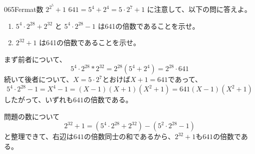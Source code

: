 \begin{prob}{065}{}{Fermat数 $2^{2^5}+1$}
 $641=5^4+2^4=5\cdot 2^7 +1$ に注意して、以下の問に答えよ。
 \begin{enumerate}
  \item $5^4\cdot 2^{28}+2^{32}$ と $5^4\cdot 2^{28} -1$ は641の倍数であることを示せ。
  \item $2^{32}+1$ は641の倍数であることを示せ。
 \end{enumerate}
\end{prob}
まず前者について、
\[ 5^4\cdot 2^{28}*2^{32}=2^{28}(5^4+2^4)=2^{28}\cdot 641 \]
続いて後者について、$X=5\cdot 2^7$とおけば$X+1=641$であって、
\[ 5^4\cdot2^{28}-1=X^4-1=(X-1)(X+1)(X^2+1)=641(X-1)(X^2+1) \]
したがって、いずれも$641$の倍数である。

問題の数について
\[ 2^{32}+1=(5^4\cdot 2^{28}+2^{32})-(5^2\cdot 2^{28}-1) \]
と整理できて、右辺は$641$の倍数同士の和であるから、$2^{32}+1$も$641$の倍数である。
